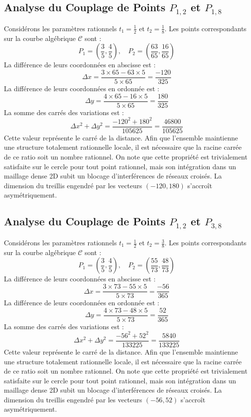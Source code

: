 \documentclass[12pt, a4paper]{article}
\begin{document}
\subsection{Analyse du Couplage de Points $P_{1,2}$ et $P_{1,8}$}
Considérons les paramètres rationnels $t_1 = \frac{1}{2}$ et $t_2 = \frac{1}{8}$.
Les points correspondants sur la courbe algébrique $\mathcal{C}$ sont :
$$ P_1 = \left( \frac{3}{5}, \frac{4}{5} \right), \quad P_2 = \left( \frac{63}{65}, \frac{16}{65} \right) $$
La différence de leurs coordonnées en abscisse est :
$$ \Delta x = \frac{3 \times 65 - 63 \times 5}{5 \times 65} = \frac{-120}{325} $$
La différence de leurs coordonnées en ordonnée est :
$$ \Delta y = \frac{4 \times 65 - 16 \times 5}{5 \times 65} = \frac{180}{325} $$
La somme des carrés des variations est :
$$ \Delta x^2 + \Delta y^2 = \frac{ -120^2 + 180^2 }{ 105625 } = \frac{ 46800 }{ 105625 } $$
Cette valeur représente le carré de la distance. Afin que l'ensemble maintienne une structure totalement rationnelle locale, il est nécessaire que la racine carrée de ce ratio soit un nombre rationnel. On note que cette propriété est trivialement satisfaite sur le cercle pour tout point rationnel, mais son intégration dans un maillage dense 2D subit un blocage d'interférences de réseaux croisés. La dimension du treillis engendré par les vecteurs $( -120, 180 )$ s'accroît asymétriquement.


\subsection{Analyse du Couplage de Points $P_{1,2}$ et $P_{3,8}$}
Considérons les paramètres rationnels $t_1 = \frac{1}{2}$ et $t_2 = \frac{3}{8}$.
Les points correspondants sur la courbe algébrique $\mathcal{C}$ sont :
$$ P_1 = \left( \frac{3}{5}, \frac{4}{5} \right), \quad P_2 = \left( \frac{55}{73}, \frac{48}{73} \right) $$
La différence de leurs coordonnées en abscisse est :
$$ \Delta x = \frac{3 \times 73 - 55 \times 5}{5 \times 73} = \frac{-56}{365} $$
La différence de leurs coordonnées en ordonnée est :
$$ \Delta y = \frac{4 \times 73 - 48 \times 5}{5 \times 73} = \frac{52}{365} $$
La somme des carrés des variations est :
$$ \Delta x^2 + \Delta y^2 = \frac{ -56^2 + 52^2 }{ 133225 } = \frac{ 5840 }{ 133225 } $$
Cette valeur représente le carré de la distance. Afin que l'ensemble maintienne une structure totalement rationnelle locale, il est nécessaire que la racine carrée de ce ratio soit un nombre rationnel. On note que cette propriété est trivialement satisfaite sur le cercle pour tout point rationnel, mais son intégration dans un maillage dense 2D subit un blocage d'interférences de réseaux croisés. La dimension du treillis engendré par les vecteurs $( -56, 52 )$ s'accroît asymétriquement.
\end{document}
